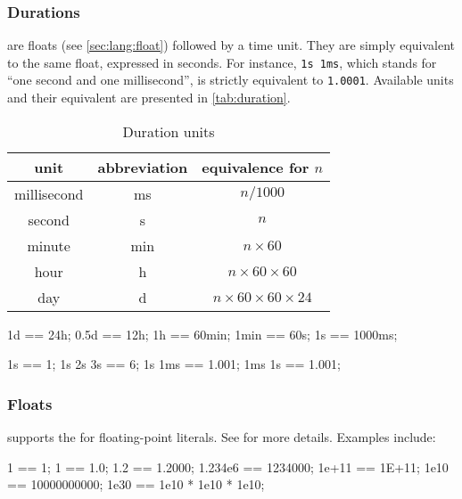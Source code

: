 \subsubsection{Durations}

 are floats (see \autoref{sec:lang:float})
followed by a time unit. They are simply equivalent to the same float,
expressed in seconds. For instance, \lstinline|1s 1ms|, which stands
for ``one second and one millisecond'', is strictly equivalent to
\lstinline|1.0001|. Available units and their equivalent are presented
in \autoref{tab:duration}.

\begin{table}
  \centering
  \begin{tabular}{|c|c|c|}
    \hline
    unit        & abbreviation & equivalence for $n$  \\
    \hline
    millisecond & ms           & $n / 1000$         \\
    second      & s            & $n$                \\
    minute      & min          & $n \times 60$           \\
    hour        & h            & $n \times 60 \times 60$      \\
    day         & d            & $n \times 60 \times 60 \times 24$ \\
    \hline
  \end{tabular}
  \caption{Duration units}
  \label{tab:duration}
\end{table}

\begin{urbiassert}
1d   == 24h;
0.5d == 12h;
1h   == 60min;
1min == 60s;
1s   == 1000ms;


1s == 1;
1s 2s 3s == 6;
1s 1ms == 1.001;
1ms 1s == 1.001;
\end{urbiassert}

\subsubsection{Floats}
\label{sec:lang:float}

\us supports the  for floating-point
literals.  See  for more details.  Examples include:


\begin{urbiassert}
            1 == 1;
            1 == 1.0;
          1.2 == 1.2000;
      1.234e6 == 1234000;
        1e+11 == 1E+11;
         1e10 == 10000000000;
         1e30 == 1e10 * 1e10 * 1e10;
\end{urbiassert}

